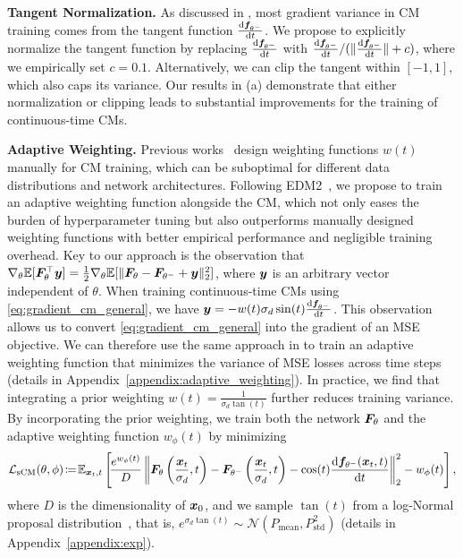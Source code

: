 \textbf{Tangent Normalization. }
As discussed in , most gradient variance in CM training comes from the tangent function $\frac{\mathrm{d} {\bm{f}}_{\theta^-}}{\mathrm{d} t}$. We propose to explicitly normalize the tangent function by replacing $\frac{\mathrm{d} {\bm{f}}_{\theta^-}}{\mathrm{d} t}$ with $\frac{\mathrm{d} {\bm{f}}_{\theta^-}}{\mathrm{d} t}/(\|\frac{\mathrm{d} {\bm{f}}_{\theta^-}}{\mathrm{d} t}\| + c)$, where we empirically set $c=0.1$. Alternatively, we can clip the tangent within $[-1, 1]$, which also caps its variance. Our results in (a) demonstrate that either normalization or clipping leads to substantial improvements for the training of continuous-time CMs.





\textbf{Adaptive Weighting. }
Previous works~\citep{song2023ict, geng2024ect} design weighting functions $w(t)$ manually for CM training, which can be suboptimal for different data distributions and network architectures. Following EDM2~\citep{karras2024edm2}, we propose to train an adaptive weighting function alongside the CM, which not only eases the burden of hyperparameter tuning but also outperforms manually designed weighting functions with better empirical performance and negligible training overhead. Key to our approach is the observation that $\nabla_\theta \mathbb{E}[{\bm{F}}_\theta^\top {\bm{y}}] = \frac{1}{2} \nabla_\theta \mathbb{E}[\|{\bm{F}}_\theta - {\bm{F}}_{\theta^-} + {\bm{y}}\|_2^2]$, where ${\bm{y}}$ is an arbitrary vector independent of $\theta$. When training continuous-time CMs using \eqref{eq:gradient_cm_general}, we have ${\bm{y}}=-w(t)\sigma_d\sin(t)\frac{\mathrm{d} {\bm{f}}_{\theta^-}}{\mathrm{d} t}$. This observation allows us to convert \eqref{eq:gradient_cm_general} into the gradient of an MSE objective. We can therefore use the same approach in \citet{karras2024edm2} to train an adaptive weighting function that minimizes the variance of MSE losses across time steps (details in Appendix~\ref{appendix:adaptive_weighting}).
In practice, we find that integrating a prior weighting $w(t)=\frac{1}{\sigma_d\tan(t)}$ further reduces training variance. By incorporating the prior weighting, we train both the network ${\bm{F}}_\theta$ and the adaptive weighting function $w_\phi(t)$ by minimizing
\begin{equation}
\label{eq:objective_ctcm}
    \mathcal{L}_{\text{sCM}}(\theta,\phi) \!\coloneqq\! \mathbb{E}_{{\bm{x}}_t,t}\left[\!
    \frac{e^{w_\phi(t)}}{D}\left\|
        {\bm{F}}_\theta\left(\frac{{\bm{x}}_t}{\sigma_d},t\right) - {\bm{F}}_{\theta^-}\left(\frac{{\bm{x}}_t}{\sigma_d},t\right)
        - \cos(t)\frac{\mathrm{d} {\bm{f}}_{\theta^-}({\bm{x}}_t,t)}{\mathrm{d} t}
    \right\|_2^2 - w_\phi(t)
    \right],
\end{equation}
where $D$ is the dimensionality of ${\bm{x}}_0$, and we sample $\tan(t)$ from a log-Normal proposal distribution~\citep{karras2022edm}, that is, $e^{\sigma_d\tan(t)} \sim \mathcal{N}(P_\text{mean}, P_\text{std}^2)$ (details in Appendix~\ref{appendix:exp}).









